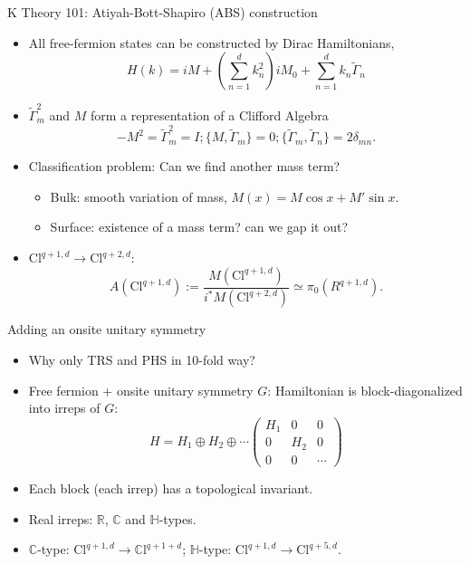 \documentclass[xcolor=table, 11pt, aspectratio=169]{beamer}
\begin{document}
  \begin{frame}{K Theory 101: Atiyah-Bott-Shapiro (ABS) construction}
    \begin{itemize}
      \item<1-> All free-fermion states can be constructed by Dirac Hamiltonians,
      \[H(k)=iM+\left(\sum_{n=1}^d k_n^2\right)iM_0+\sum_{n=1}^d k_n\tilde{\Gamma}_n\]
      \item<1-> $\tilde \Gamma_m^2$ and $M$ form a representation of a Clifford Algebra
      \[-M^2=\tilde \Gamma_m^2=I; \{M,\tilde\Gamma_m\}=0;
      \{\tilde\Gamma_m,\tilde\Gamma_n\}=2\delta_{mn}.\]
      \item<2-> Classification problem: Can we find another mass term?
      \begin{itemize}
        \item Bulk: smooth variation of mass, $M(x)=M\cos x+M'\sin x$.
        \item Surface: existence of a mass term? can we gap it out?
      \end{itemize}
      \item<3-> $\mathrm{Cl}^{q+1,d}\rightarrow\mathrm{Cl}^{q+2,d}$:
      \[A(\mathrm{Cl}^{q+1,d}):=\frac{M(\mathrm{Cl}^{q+1,d})}{i^\ast M(\mathrm{Cl}^{q+2,d})}\simeq\pi_0(R^{q+1,d}).\]
    \end{itemize}
  \end{frame}

  \begin{frame}{Adding an onsite unitary symmetry}
    \begin{itemize}
      \item<1-> Why only TRS and PHS in 10-fold way?
      \item<2-> Free fermion + onsite unitary symmetry $G$: Hamiltonian is block-diagonalized into irreps of $G$:
      \[H=H_1\oplus H_2\oplus\cdots\begin{pmatrix}
        H_1 & 0 & 0\\
        0 & H_2 & 0\\
        0 & 0 & \cdots
      \end{pmatrix}\]
      \item<2-> Each block (each irrep) has a topological invariant.
      \item<3-> Real irreps: $\mathbb R$, $\mathbb C$ and $\mathbb H$-types.
      \item<3-> $\mathbb C$-type: $\mathrm{Cl}^{q+1,d}\rightarrow \mathbb{C}\mathrm{l}^{q+1+d}$;
      $\mathbb H$-type: $\mathrm{Cl}^{q+1,d}\rightarrow \mathrm{Cl}^{q+5,d}$.
    \end{itemize}
  \end{frame}
\end{document}

